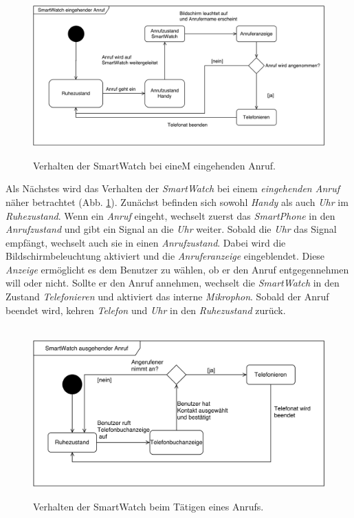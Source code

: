 \begin{figure}[h]
\centering\
\includegraphics[width=\textwidth]{img/stateAnrufEingehend}
\caption[State Diagram: eingehender Anruf]{Verhalten der SmartWatch bei eineM eingehenden Anruf.}
\label{fig:stateAnrufEingehend}
\end{figure}
Als Nächstes wird das Verhalten der \textit{SmartWatch} bei einem \textit{eingehenden Anruf} näher betrachtet (Abb. \ref{fig:stateAnrufEingehend}). Zunächst befinden sich sowohl \textit{Handy} als auch \textit{Uhr} im \textit{Ruhezustand}. Wenn ein \textit{Anruf} eingeht, wechselt zuerst das \textit{SmartPhone} in den \textit{Anrufzustand} und gibt ein Signal an die \textit{Uhr} weiter. Sobald die \textit{Uhr} das Signal empfängt, wechselt auch sie in einen \textit{Anrufzustand}. Dabei wird die Bildschirmbeleuchtung aktiviert und die \textit{Anruferanzeige} eingeblendet. Diese \textit{Anzeige} ermöglicht es dem Benutzer zu wählen, ob er den Anruf entgegennehmen will oder nicht. Sollte er den Anruf annehmen, wechselt die \textit{SmartWatch} in den Zustand \textit{Telefonieren} und aktiviert das interne \textit{Mikrophon}. Sobald der Anruf beendet wird, kehren \textit{Telefon} und \textit{Uhr} in den \textit{Ruhezustand} zurück.\\
\begin{figure}[h]
\centering\
\includegraphics[width=\textwidth]{img/stateAnrufAusgehend}
\caption[State Diagram: ausgehender Anruf]{Verhalten der SmartWatch beim Tätigen eines Anrufs.}
\label{fig:stateAnrufAusgehend}
\end{figure}
